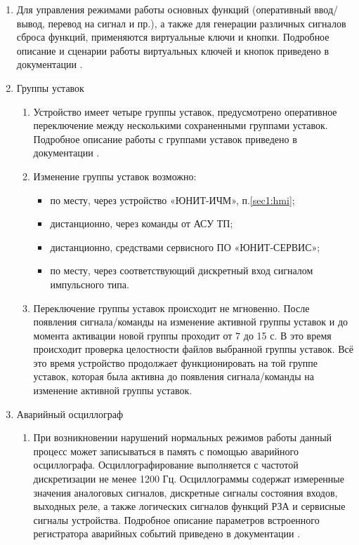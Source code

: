 \begin{enumerate}[label=\arabic{section}.\arabic{subsection}.\arabic*, labelsep=7pt, leftmargin=0pt, itemindent=60pt, align=left]
\item
Для управления режимами работы основных функций (оперативный ввод/вывод, перевод на сигнал и пр.), а также для генерации различных сигналов сброса функций, применяются виртуальные ключи и кнопки.
Подробное описание и сценарии работы виртуальных ключей и кнопок приведено в документации \ManualUnitGeneral. 

\item Группы уставок
\begin{enumerate}

\item Устройство имеет четыре группы уставок, предусмотрено оперативное переключение между несколькими сохраненными группами уставок. Подробное описание работы с группами уставок приведено в документации \ManualUnitGeneral.

\item
Изменение группы уставок возможно:
\begin{itemize}
    \item по месту, через устройство «ЮНИТ-ИЧМ», п.\ref{sec1:hmi};
    \item дистанционно, через команды от АСУ ТП;
    \item дистанционно, средствами сервисного ПО «ЮНИТ-СЕРВИС»;
    \item по месту, через соответствующий дискретный вход сигналом импульсного типа.
\end{itemize}

\item
Переключение группы уставок происходит не мгновенно.
После появления сигнала/команды на изменение активной группы уставок и до момента активации новой группы проходит от 7 до 15 с.
В это время происходит проверка целостности файлов выбранной группы уставок.
Всё это время устройство продолжает функционировать на той группе уставок, которая была активна до появления сигнала/команды на изменение активной группы уставок.

\end{enumerate}

\item Аварийный осциллограф
\begin{enumerate}
\item
При возникновении нарушений нормальных режимов работы данный процесс может записываться в память с помощью аварийного осциллографа.
Осциллографирование выполняется с частотой дискретизации не менее 1200 Гц.
Осциллограммы содержат измеренные значения аналоговых сигналов, дискретные сигналы состояния входов, выходных реле, а также логических сигналов функций РЗА и сервисные сигналы устройства.
Подробное описание параметров встроенного регистратора аварийных событий приведено в документации \ManualUnitGeneral.


\end{enumerate}
\end{enumerate}
